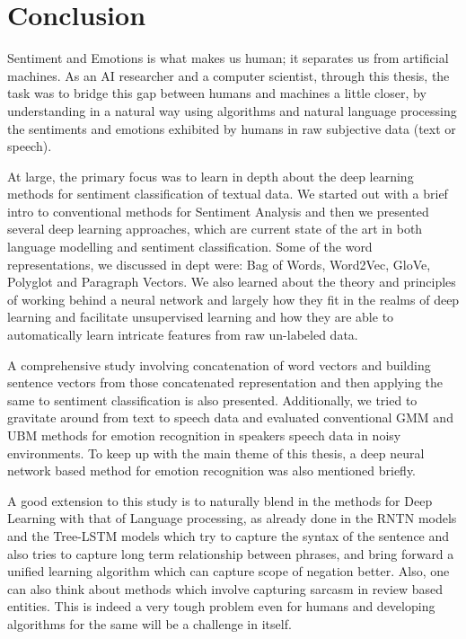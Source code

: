 \chapter{Conclusion}\label{chapter:conclusion}
Sentiment and Emotions is what makes us human; it separates us from artificial machines. As an AI researcher and a computer scientist, through this thesis, the task was to bridge this gap between humans and machines a little closer, by understanding in a natural way using algorithms and natural language processing the sentiments and emotions exhibited by humans in raw subjective data (text or speech). 
\newline

 At large, the primary focus was to learn in depth about the deep learning methods for sentiment classification of textual data. We started out with a brief intro to conventional methods for Sentiment Analysis and then we presented several deep learning approaches, which are current state of the art in both language modelling and sentiment classification. Some of the word representations, we discussed in dept were: Bag of Words, Word2Vec, GloVe, Polyglot and Paragraph Vectors. We also learned about the theory and principles of working behind a neural network and largely how they fit in the realms of deep learning and facilitate unsupervised learning and how they are able to automatically learn intricate features from raw un-labeled data.  
 
 A comprehensive study involving concatenation of word vectors and building sentence vectors from those concatenated representation and then applying the same to sentiment classification is also presented.  Additionally, we tried to gravitate around from text to speech data and evaluated conventional GMM and UBM methods for emotion recognition in speakers speech data in noisy environments. To keep up with the main theme of this thesis, a deep neural network based method for emotion recognition was also mentioned briefly.
\newline

A good extension to this study is to naturally blend in the methods for Deep Learning with that of Language processing, as already done in the RNTN models and the Tree-LSTM models which try to capture the syntax of the sentence and also tries to capture long term relationship between phrases, and bring forward a unified learning algorithm which can capture scope of negation better. Also, one can also think about methods which involve capturing sarcasm in review based entities. This is indeed a very tough problem even for humans and developing algorithms for the same will be a challenge in itself. 
